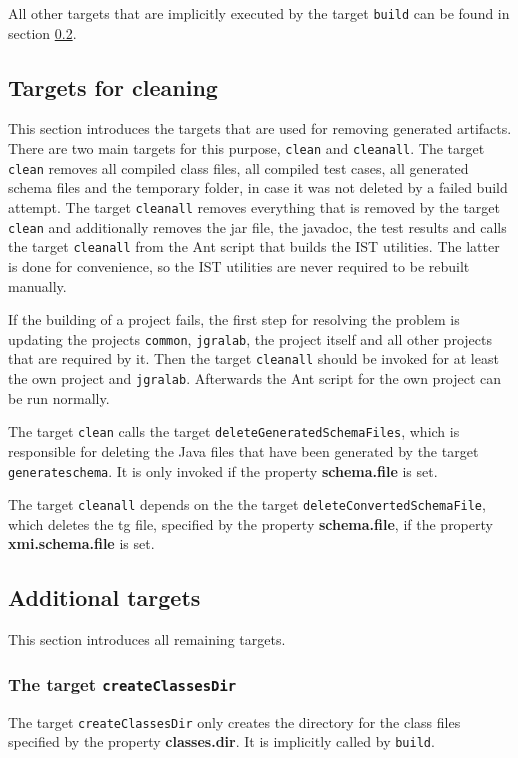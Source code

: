 \documentclass[a4paper,twoside,11pt,bibtotoc]{article}
\begin{document}
All other targets that are implicitly executed by the target \texttt{build} can be found in section \ref{sec:additional}.

\subsection{Targets for cleaning}
\label{sec:cleaning}
This section introduces the targets that are used for removing generated artifacts.
There are two main targets for this purpose, \texttt{clean} and \texttt{cleanall}.
The target \texttt{clean} removes all compiled class files, all compiled test cases, all generated schema files and the temporary folder, in case it was not deleted by a failed build attempt.
The target \texttt{cleanall} removes everything that is removed by the target \texttt{clean} and additionally removes the jar file, the javadoc, the test results and calls the target \texttt{cleanall} from the Ant script that builds the IST utilities.
The latter is done for convenience, so the IST utilities are never required to be rebuilt manually.

If the building of a project fails, the first step for resolving the problem is updating the projects \texttt{common}, \texttt{jgralab}, the project itself and all other projects that are required by it.
Then the target \texttt{cleanall} should be invoked for at least the own project and \texttt{jgralab}.
Afterwards the Ant script for the own project can be run normally.

The target \texttt{clean} calls the target \texttt{deleteGeneratedSchemaFiles}, which is responsible for deleting the Java files that have been generated by the target \texttt{generateschema}.
It is only invoked if the property \textbf{schema.file} is set.

The target \texttt{cleanall} depends on the the target \texttt{deleteConvertedSchemaFile}, which deletes the tg file, specified by the property \textbf{schema.file}, if the property \textbf{xmi.schema.file} is set.


\subsection{Additional targets}
\label{sec:additional}
This section introduces all remaining targets.

\subsubsection{The target \texttt{createClassesDir}}
The target \texttt{createClassesDir} only creates the directory for the class files specified by the property \textbf{classes.dir}.
It is implicitly called by \texttt{build}.
\end{document}
